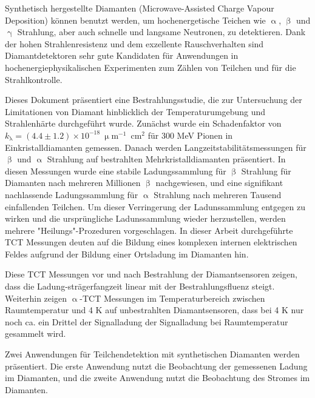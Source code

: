 \begin{abstractger}

Synthetisch hergestellte Diamanten (Microwave-Assisted Charge Vapour Deposition) k\"onnen benutzt werden, um hochenergetische Teichen wie $\upalpha$, $\upbeta$ und $\upgamma$ Strahlung, aber auch schnelle und langsame Neutronen, zu detektieren. Dank der hohen Strahlenresistenz und dem exzellente Rauschverhalten sind Diamantdetektoren sehr gute Kandidaten f\"ur Anwendungen in hochenergiephysikalischen Experimenten zum Z\"ahlen von Teilchen und f\"ur die Strahlkontrolle.

Dieses Dokument pr\"asentiert eine Bestrahlungsstudie, die zur Untersuchung der Limitationen von Diamant hinblicklich der Temperaturumgebung und Strahlenh\"arte durchgef\"uhrt wurde. Zun\"achst wurde ein Schadenfaktor von $k_{\mathrm{\lambda}}=(4.4\pm1.2)\times10^{-18}~\upmu$m$^{-1}$~cm$^{2}$ f\"ur 300 MeV Pionen in Einkristalldiamanten gemessen. Danach werden Langzeitstabilit\"atsmessungen f\"ur $\upbeta$ und $\upalpha$ Strahlung auf bestrahlten Mehrkristalldiamanten pr\"asentiert. In diesen Messungen wurde eine stabile Ladungssammlung f\"ur $\upbeta$ Strahlung f\"ur Diamanten nach mehreren Millionen $\upbeta$ nachgewiesen, und eine signifikant nachlassende Ladungssammlung f\"ur $\upalpha$ Strahlung nach mehreren Tausend einfallenden Teilchen. Um dieser Verringerung der Ladunssammlung entgegen zu wirken und die urspr\"ungliche Ladunssammlung wieder herzustellen, werden mehrere "Heilungs"-Prozeduren vorgeschlagen. In dieser Arbeit durchgef\"uhrte TCT Messungen deuten auf die Bildung eines komplexen internen elektrischen Feldes aufgrund der Bildung einer Ortsladung im Diamanten hin.

Diese TCT Messungen vor und nach Bestrahlung der Diamantsensoren zeigen, dass die Ladung-str\"agerfangzeit linear mit der Bestrahlungsfluenz steigt. Weiterhin zeigen $\upalpha$-TCT Messungen im Temperaturbereich zwischen Raumtemperatur und 4 K auf unbestrahlten Diamantsensoren, dass bei 4 K nur noch ca. ein Drittel der Signalladung der Signalladung bei Raumtemperatur gesammelt wird. 

Zwei Anwendungen f\"ur Teilchendetektion mit synthetischen Diamanten werden pr\"asentiert. Die erste Anwendung nutzt die Beobachtung der gemessenen Ladung im Diamanten, und die zweite Anwendung nutzt die Beobachtung des Stromes im Diamanten.


\end{abstractger}

